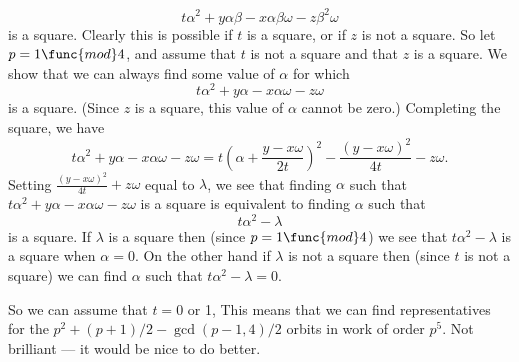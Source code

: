\documentclass[12pt]{article}
\begin{document}
\[
t\alpha ^{2}+y\alpha \beta -x\alpha \beta \omega -z\beta ^{2}\omega 
\]%
is a square. Clearly this is possible if $t$ is a square, or if $z$ is not a
square. So let $p=1\func{mod}4$, and assume that $t$ is not a square and
that $z$ is a square. We show that we can always find some value of $\alpha $
for which%
\[
t\alpha ^{2}+y\alpha -x\alpha \omega -z\omega 
\]%
is a square. (Since $z$ is a square, this value of $\alpha $ cannot be
zero.) Completing the square, we have%
\[
t\alpha ^{2}+y\alpha -x\alpha \omega -z\omega =t(\alpha +\frac{y-x\omega }{2t%
})^{2}-\frac{(y-x\omega )^{2}}{4t}-z\omega .
\]%
Setting $\frac{(y-x\omega )^{2}}{4t}+z\omega $ equal to $\lambda $, we see
that finding $\alpha $ such that $t\alpha ^{2}+y\alpha -x\alpha \omega
-z\omega $ is a square is equivalent to finding $\alpha $ such that 
\[
t\alpha ^{2}-\lambda 
\]%
is a square. If $\lambda $ is a square then (since $p=1\func{mod}4$) we see
that $t\alpha ^{2}-\lambda $ is a square when $\alpha =0$. On the other hand
if $\lambda $ is not a square then (since $t$ is not a square) we can find $%
\alpha $ such that $t\alpha ^{2}-\lambda =0$.

So we can assume that $t=0$ or 1, This means that we can find
representatives for the $p^{2}+(p+1)/2-\gcd (p-1,4)/2$ orbits in work of
order $p^{5}$. Not brilliant --- it would be nice to do better.
\end{document}
